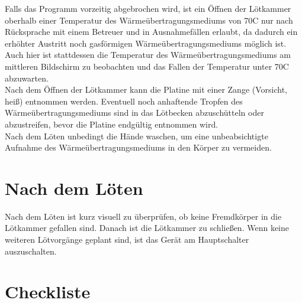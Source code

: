 \documentclass{\basedir/fablab-document}
\begin{document}
Falls das Programm vorzeitig abgebrochen wird, ist ein {\"O}ffnen der L{\"o}tkammer oberhalb einer Temperatur des W{\"a}rme{\"u}bertragungsmediums von 70\textdegree C nur nach R{\"u}cksprache mit einem Betreuer und in Ausnahmef{\"a}llen erlaubt, da dadurch ein erh{\"o}hter Austritt noch gasf{\"o}rmigen W{\"a}rme{\"u}bertragungsmediums m{\"o}glich ist. Auch hier ist stattdessen die Temperatur des W{\"a}rme{\"u}bertragungsmediums am mittleren Bildschirm zu beobachten und das Fallen der Temperatur unter 70\textdegree C abzuwarten.\\

Nach dem {\"O}ffnen der L{\"o}tkammer kann die Platine mit einer Zange (Vorsicht, hei{\ss}) entnommen werden. Eventuell noch anhaftende Tropfen des W{\"a}rme{\"u}bertragungsmediums sind in das L{\"o}tbecken abzusch{\"u}tteln oder abzustreifen, bevor die Platine endg{\"u}ltig entnommen wird.\\

Nach dem L{\"o}ten unbedingt die H{\"a}nde waschen, um eine unbeabsichtigte Aufnahme des W{\"a}rme{\"u}bertragungsmediums in den K{\"o}rper zu vermeiden.

\section{Nach dem L{\"o}ten}

Nach dem L{\"o}ten ist kurz visuell zu {\"u}berpr{\"u}fen, ob keine Fremdk{\"o}rper in die L{\"o}tkammer gefallen sind. Danach ist die L{\"o}tkammer zu schlie{\ss}en. Wenn keine weiteren L{\"o}tvorg{\"a}nge geplant sind, ist das Ger{\"a}t am Hauptschalter auszuschalten.
	\newpage
	\section{Checkliste}
\end{document}
